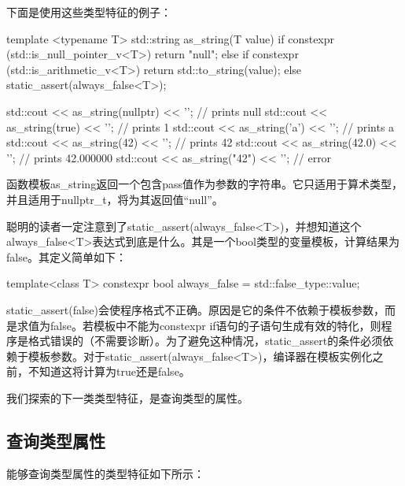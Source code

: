 下面是使用这些类型特征的例子：

\begin{cpp}
template <typename T>
std::string as_string(T value)
{
	if constexpr (std::is_null_pointer_v<T>)
		return "null";
	else if constexpr (std::is_arithmetic_v<T>)
		return std::to_string(value);
	else
		static_assert(always_false<T>);
}

std::cout << as_string(nullptr) << '\n'; // prints null
std::cout << as_string(true) << '\n'; // prints 1
std::cout << as_string('a') << '\n'; // prints a
std::cout << as_string(42) << '\n'; // prints 42
std::cout << as_string(42.0) << '\n'; // prints 42.000000
std::cout << as_string("42") << '\n'; // error
\end{cpp}

函数模板as\_string返回一个包含pass值作为参数的字符串。它只适用于算术类型，并且适用于nullptr\_t，将为其返回值“null”。

聪明的读者一定注意到了static\_assert(always\_false<T>)，并想知道这个always\_false<T>表达式到底是什么。其是一个bool类型的变量模板，计算结果为false。其定义简单如下：

\begin{cpp}
template<class T>
constexpr bool always_false = std::false_type::value;
\end{cpp}

static\_assert(false)会使程序格式不正确。原因是它的条件不依赖于模板参数，而是求值为false。若模板中不能为constexpr if语句的子语句生成有效的特化，则程序是格式错误的（不需要诊断）。为了避免这种情况，static\_assert的条件必须依赖于模板参数。对于static\_assert(always\_false<T>)，编译器在模板实例化之前，不知道这将计算为true还是false。

我们探索的下一类类型特征，是查询类型的属性。

\subsection{查询类型属性}

能够查询类型属性的类型特征如下所示：


